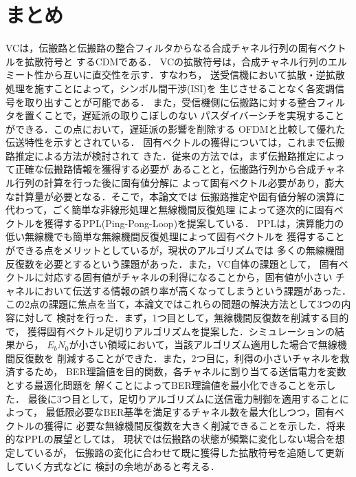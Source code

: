 \chapter{まとめ}
VCは，伝搬路と伝搬路の整合フィルタからなる合成チャネル行列の固有ベクトルを拡散符号と
するCDMである．
VCの拡散符号は，合成チャネル行列のエルミート性から互いに直交性を示す．すなわち，
送受信機において拡散・逆拡散処理を施すことによって，シンボル間干渉(ISI)を
生じさせることなく各変調信号を取り出すことが可能である．
また，受信機側に伝搬路に対する整合フィルタを置くことで，遅延派の取りこぼしのない
パスダイバーシチを実現することができる．この点において，遅延派の影響を削除する
OFDMと比較して優れた伝送特性を示すとされている．
固有ベクトルの獲得については，これまで伝搬路推定による方法が検討されて
きた．従来の方法では，まず伝搬路推定によって正確な伝搬路情報を獲得する必要が
あることと，伝搬路行列から合成チャネル行列の計算を行った後に固有値分解に
よって固有ベクトル必要があり，膨大な計算量が必要となる．そこで，本論文では
伝搬路推定や固有値分解の演算に代わって，ごく簡単な非線形処理と無線機間反復処理
によって逐次的に固有ベクトルを獲得するPPL(Ping-Pong-Loop)を提案している．
PPLは，演算能力の低い無線機でも簡単な無線機間反復処理によって固有ベクトルを
獲得することができる点をメリットとしているが，現状のアルゴリズムでは
多くの無線機間反復数を必要とするという課題があった．また，VC自体の課題として，
固有ベクトルに対応する固有値がチャネルの利得になることから，固有値が小さい
チャネルにおいて伝送する情報の誤り率が高くなってしまうという課題があった．
この2点の課題に焦点を当て，本論文ではこれらの問題の解決方法として3つの内容に対して
検討を行った．まず，1つ目として，無線機間反復数を削減する目的で，
獲得固有ベクトル足切りアルゴリズムを提案した．シミュレーションの結果から，
$E_bN_0$が小さい領域において，当該アルゴリズム適用した場合で無線機間反復数を
削減することができた．また，2つ目に，利得の小さいチャネルを救済するため，
BER理論値を目的関数，各チャネルに割り当てる送信電力を変数とする最適化問題を
解くことによってBER理論値を最小化できることを示した．
最後に3つ目として，足切りアルゴリズムに送信電力制御を適用することによって，
最低限必要なBER基準を満足するチャネル数を最大化しつつ，固有ベクトルの獲得に
必要な無線機間反復数を大きく削減できることを示した．将来的なPPLの展望としては，
現状では伝搬路の状態が頻繁に変化しない場合を想定しているが，
伝搬路の変化に合わせて既に獲得した拡散符号を追随して更新していく方式などに
検討の余地があると考える．